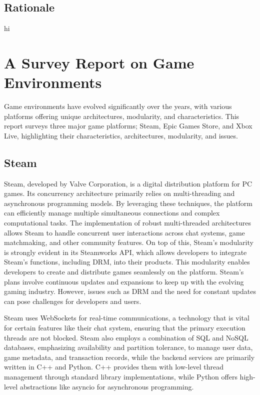\documentclass[]{final}
\begin{document}
\section{Rationale}
hi




\chapter{A Survey Report on Game Environments}

Game environments have evolved significantly over the years, with various platforms
offering unique architectures, modularity, and characteristics. This report surveys
three major game platforms; Steam, Epic Games Store, and Xbox Live, highlighting
their characteristics, architectures, modularity, and issues.

\section{Steam}
Steam, developed by Valve Corporation, is a digital distribution platform
for PC games. Its concurrency architecture primarily relies on multi-threading and asynchronous
programming models. By leveraging these techniques, the platform can efficiently manage
multiple simultaneous connections and complex computational tasks. The implementation
of robust multi-threaded architectures allows Steam to handle concurrent user interactions
across chat systems, game matchmaking, and other community features. On top of this,
Steam's modularity is strongly evident in its Steamworks API, which allows developers to
integrate Steam's functions, including DRM, into their products.\cite{simmons_decoding_2023, noauthor_steamworks_nodate}
This modularity enables developers to create and distribute games seamlessly on the platform.
Steam's plans involve continuous updates and expansions to keep up with
the evolving gaming industry.\cite{noauthor_steam_nodate1} However, issues such as DRM and the need for
constant updates can pose challenges for developers and users\cite{noauthor_steam_nodate}.

Steam uses WebSockets for real-time communications, a technology that is vital
for certain features like their chat system, ensuring that the primary execution threads are not blocked.\cite{noauthor_isteamnetworkingsockets_nodate}
Steam also employs a combination of SQL and NoSQL databases\cite{simmons_decoding_2023, djundik_how_2017}, emphasizing availability
and partition tolerance, to manage user data, game metadata, and transaction records, while
the backend services are primarily written in C++ and Python.\cite{simmons_decoding_2023}  C++ provides them with low-level thread management through standard
library implementations, while Python offers high-level abstractions like asyncio
for asynchronous programming.
\end{document}
